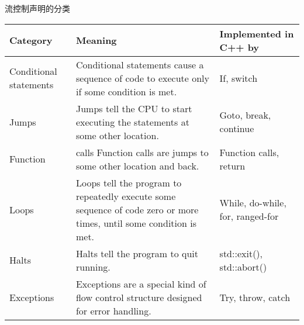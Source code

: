 \documentclass[../../LearnCpp.tex]{subfiles}
\begin{document}

流控制声明的分类

\begin{center}
  \begin{tiny}
    \begin{tabularx}{ 1\textwidth}{
        | >{\raggedright\arraybackslash}X
        | >{\raggedright\arraybackslash}X
        | >{\raggedright\arraybackslash}X |
      }
      \hline
      Category               & Meaning                                                                                                             & Implemented in C++ by            \\
      \hline
      Conditional statements & Conditional statements cause a sequence of code to execute only if some condition is met.                           & If, switch                       \\
      Jumps                  & Jumps tell the CPU to start executing the statements at some other location.                                        & Goto, break, continue            \\
      Function               & calls Function calls are jumps to some other location and back.                                                     & Function calls, return           \\
      Loops                  & Loops tell the program to repeatedly execute some sequence of code zero or more times, until some condition is met. & While, do-while, for, ranged-for \\
      Halts                  & Halts tell the program to quit running.                                                                             & std::exit(), std::abort()        \\
      Exceptions             & Exceptions are a special kind of flow control structure designed for error handling.                                & Try, throw, catch                \\
      \hline
    \end{tabularx}
  \end{tiny}
\end{center}
\end{document}
